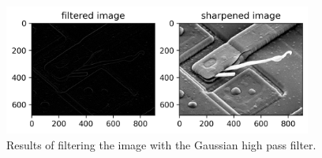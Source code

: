 \begin{figure}[htbp]
    \centering
	\includegraphics[width=0.9\textwidth]{../images/p1/p1b_result.png}
    \caption{Results of filtering the image with the Gaussian high pass filter.}
    \label{fig:p1b_result}
\end{figure}

\newpage